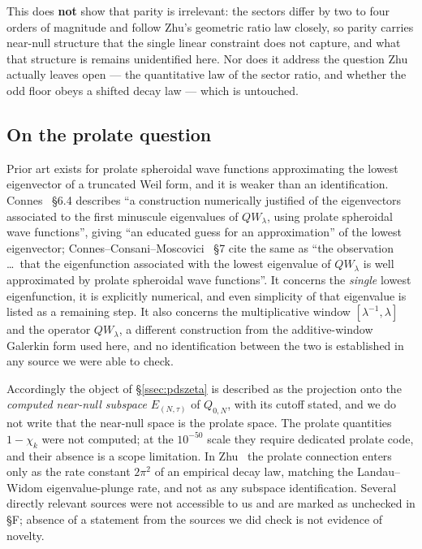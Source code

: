 This does \textbf{not} show that parity is irrelevant: the sectors differ by two to four
orders of magnitude and follow Zhu's geometric ratio law closely, so parity carries
near-null structure that the single linear constraint does not capture, and what that
structure is remains unidentified here. Nor does it address the question Zhu actually leaves
open --- the quantitative law of the sector ratio, and whether the odd floor obeys a shifted
decay law --- which is untouched.

\subsection{On the prolate question}\label{ssec:pdsprolate}

Prior art exists for prolate spheroidal wave functions approximating the lowest
eigenvector of a truncated Weil form, and it is weaker than an identification.
Connes~\cite{ConnesLetter} \S6.4 describes ``a construction numerically justified of the
eigenvectors associated to the first minuscule eigenvalues of $QW_\lambda$, using prolate
spheroidal wave functions'', giving ``an educated guess for an approximation'' of the
lowest eigenvector; Connes--Consani--Moscovici~\cite{CCM} \S7 cite the same as ``the
observation \dots\ that the eigenfunction associated with the lowest eigenvalue of
$QW_\lambda$ is well approximated by prolate spheroidal wave functions''. It concerns the
\emph{single} lowest eigenfunction, it is explicitly numerical, and even simplicity of that
eigenvalue is listed as a remaining step. It also concerns the multiplicative window
$[\lambda^{-1},\lambda]$ and the operator $QW_\lambda$, a different construction from the
additive-window Galerkin form used here, and no identification between the two is
established in any source we were able to check.

Accordingly the object of \S\ref{ssec:pdszeta} is described as the projection onto the
\emph{computed near-null subspace} $E_{(N,\tau)}$ of $Q_{0,N}$, with its cutoff stated, and
we do not write that the near-null space is the prolate space. The prolate quantities
$1-\chi_k$ were not computed; at the $10^{-50}$ scale they require dedicated prolate code,
and their absence is a scope limitation. In Zhu~\cite{Zhu} the prolate connection enters
only as the rate constant $2\pi^{2}$ of an empirical decay law, matching the Landau--Widom
eigenvalue-plunge rate, and not as any subspace identification. Several directly relevant
sources were not accessible to us and are marked as unchecked in
 \S F; absence of a statement from the sources we did
check is not evidence of novelty.

